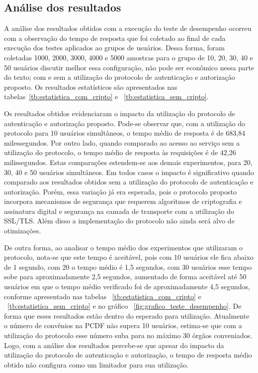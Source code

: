 \subsection{Análise dos resultados}

A análise dos resultados obtidos com a execução do teste de desempenho ocorreu com a observação do tempo de resposta que foi coletado ao final de cada execução dos testes aplicados ao grupos de usuários. Dessa forma, foram coletadas 1000, 2000, 3000, 4000 e 5000 amostras para o grupo de 10, 20, 30, 40 e 50 usuários {\color{red}discutir melhor essa configura\c c\~{a}o, n\~{a}o pode ser econ\^{o}mico nessa parte do texto}; com e sem a utilização do protocolo de autenticação e autorização proposto. Os resultados estatísticos são apresentados nas tabelas~\ref{tb:estatistica_com_cripto} e ~\ref{tb:estatistica_sem_cripto}.

Os resultados obtidos evidenciaram o impacto da utilização do protocolo de autenticação e autorização proposto. Pode-se observar que, com a utilização do protocolo para 10 usuários simultâneos, o tempo médio de resposta é de 683,84 milessegundos. Por outro lado, quando comparado ao acesso ao serviço sem a utilização do protocolo, o tempo m\'{e}dio de 
resposta \`{a}s requisi\c c\~{o}es \'{e} de 42,26 milissegundos. Estas comparações estendem-se aos demais experimentos, para 20, 30, 40 e 50 usuários simultâneos. Em todos casos o impacto é significativo quando comparado aos resultados obtidos sem a utilização do protocolo de autenticação e autorização. Porém, essa variação já era esperada, pois o protocolo proposto incorpora mecanismos de segurança que requerem algoritmos de criptografia e assinatura digital e segurança na camada de transporte com a utilização do SSL/TLS. Al\'{e}m disso
 a implementa\c c\~{a}o do protocolo n\~{a}o ainda ser\'{a} alvo de otimiza\c c\~{o}es. 

De outra forma, ao analisar o tempo médio dos experimentos que utilizaram o protocolo, nota-se que este tempo é aceitável, pois com 10 usuários ele fica abaixo de 1 segundo, com 20 o tempo médio é 1,5 segundos, com 30 usuários esse tempo sobe para aproximadamente 2,5 segundos, aumentado de forma aceitável até 50 usuários em que o tempo médio verificado foi de aproximadamente 4,5 segundos, conforme apresentado nas tabelas ~\ref{tb:estatistica_com_cripto} e ~\ref{tb:estatistica_sem_cripto} e no gráfico ~\ref{fig:grafico_teste_desempenho}. De forma que esses resultados estão dentro do esperado para utilização. Atualmente o número de convênios na PCDF não supera 10 usuários, estima-se que com a utilização do protocolo esse número suba para no máximo 30 órgãos conveniados. Logo, com a análise dos resultados percebe-se que apesar do impacto da utilização do protocolo de autenticação e autorização, o tempo de resposta médio obtido não configura como um limitador para sua utilização.


